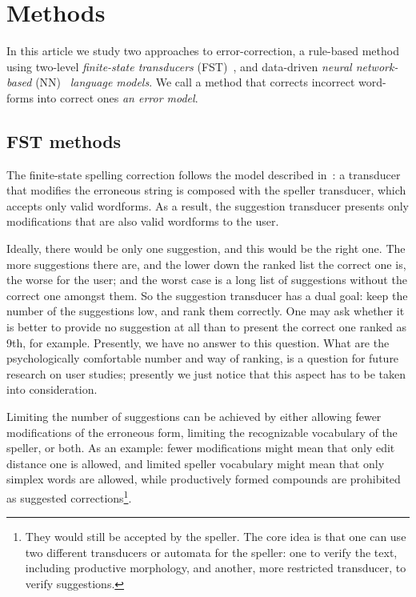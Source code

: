 \documentclass{flammie}
\begin{document}
\section{Methods}

In this article we study two approaches to error-correction, a rule-based method
using two-level \textit{finite-state transducers}
(FST)~\cite{pirinen2014state}, and data-driven \textit{neural network-based}
(NN)~\cite{hochreiter1997long,bollmann2016improving} \textit{language
models}. We call a method that corrects incorrect word-forms into correct ones
\textit{an error model}.

\subsection{FST methods}

The finite-state spelling correction follows the model described
in~\cite{pirinen2010finitestate}: a transducer that modifies the erroneous
string is composed with the speller transducer, which accepts only valid
wordforms. As a result, the suggestion transducer presents only modifications
that are also valid wordforms to the user.

Ideally, there would be only one suggestion, and this would be the right one.
The more suggestions there are, and the lower down the ranked list the correct
one is, the worse for the user; and the worst case is a long list of suggestions
without the correct one amongst them. So the suggestion transducer has a dual
goal: keep the number of the suggestions low, and rank them correctly. One may
ask whether it is better to provide no suggestion at all than to present the
correct one ranked as 9th, for example. Presently, we have no answer to this
question. What are the psychologically comfortable number and way of ranking, is
a question for future research on user studies; presently we just notice that
this aspect has to be taken into consideration.

Limiting the number of suggestions can be achieved by either allowing fewer
modifications of the erroneous form, limiting the recognizable vocabulary of the
speller, or both. As an example: fewer modifications might mean that only edit
distance one is allowed, and limited speller vocabulary might mean that only
simplex words are allowed, while productively formed compounds are prohibited as
suggested corrections\footnote{They would still be accepted by the speller. The
core idea is that one can use two different transducers or automata for the
speller: one to verify the text, including productive morphology, and another,
more restricted transducer, to verify suggestions.}.
\end{document}

